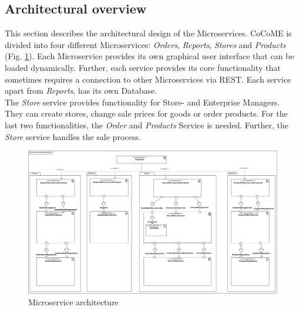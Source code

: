	\FloatBarrier
	\subsection{Architectural overview}	\label{archiOverviewMicro}	
	This section describes the architectural design of the Microservices. CoCoME is divided into four different Microservices: \textit{Orders}, \textit{Reports}, \textit{Stores} and \textit{Products} (Fig. \ref{MS_ARch}). Each Microservice provides its own graphical user interface that can be loaded dynamically. Further, each service provides its core functionality that sometimes requires a connection to other Microservices via REST. Each service apart  from \textit{Reports}, has its own Database. \\
	The \textit{Store} service provides functionality for Store- and Enterprise Managers. They can create stores, change sale prices for goods or order products. For the last two functionalities, the \textit{Order} and \textit{Products} Service is needed. Further, the \textit{Store} service handles the sale process. 
	


	
	
	\begin{figure}
	   	\includegraphics[width=\textwidth]{img/MicroserviceArchitecture.jpg}
	   	\caption{Microservice architecture}
	   	\label{MS_ARch}
	\end{figure}
